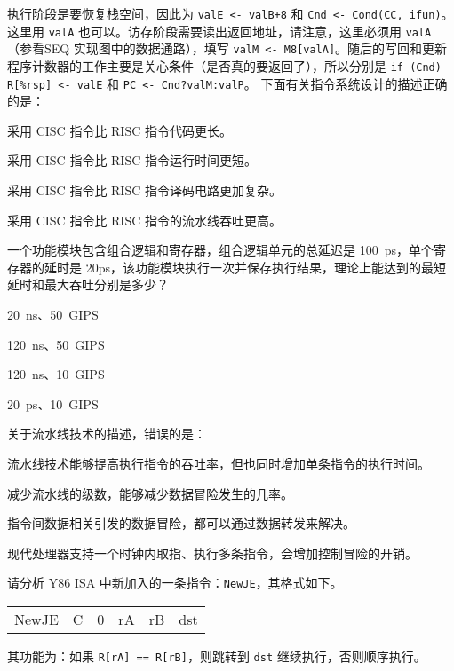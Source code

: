 \begin{problems}
        执行阶段是要恢复栈空间，因此为 \verb|valE <- valB+8| 和 \verb|Cnd <- Cond(CC, ifun)|。这里用 \verb|valA| 也可以。访存阶段需要读出返回地址，请注意，这里必须用 \verb|valA|（参看SEQ 实现图中的数据通路），填写 \verb|valM <- M8[valA]|。随后的写回和更新程序计数器的工作主要是关心条件（是否真的要返回了），所以分别是 \verb|if (Cnd) R[%rsp] <- valE| 和 \verb|PC <- Cnd?valM:valP|。
         下面有关指令系统设计的描述正确的是：
        \begin{choices}
            \item 采用 CISC 指令比 RISC 指令代码更长。
            \item 采用 CISC 指令比 RISC 指令运行时间更短。
            \item 采用 CISC 指令比 RISC 指令译码电路更加复杂。
            \item 采用 CISC 指令比 RISC 指令的流水线吞吐更高。
        \end{choices}
         一个功能模块包含组合逻辑和寄存器，组合逻辑单元的总延迟是 \SI{100}{ps}，单个寄存器的延时是 20ps，该功能模块执行一次并保存执行结果，理论上能达到的最短延时和最大吞吐分别是多少？
        \begin{choices}
            \item \SI{20}{ns}、\SI{50}{GIPS}
            \item \SI{120}{ns}、\SI{50}{GIPS}
            \item \SI{120}{ns}、\SI{10}{GIPS}
            \item \SI{20}{ps}、\SI{10}{GIPS}
        \end{choices}
         关于流水线技术的描述，错误的是：
        \begin{choices}
            \item 流水线技术能够提高执行指令的吞吐率，但也同时增加单条指令的执行时间。
            \item 减少流水线的级数，能够减少数据冒险发生的几率。
            \item 指令间数据相关引发的数据冒险，都可以通过数据转发来解决。
            \item 现代处理器支持一个时钟内取指、执行多条指令，会增加控制冒险的开销。
        \end{choices}
         请分析 Y86 ISA 中新加入的一条指令：\verb|NewJE|，其格式如下。
        \begin{table}[H]
            \centering
            \begin{tabular}{c|c|c|c|c|c|}
                \cline{2-6}
                NewJE & C & 0 & rA & rB & dst \\ \cline{2-6} 
            \end{tabular}
        \end{table}
        其功能为：如果 \verb|R[rA] == R[rB]|，则跳转到 \verb|dst| 继续执行，否则顺序执行。


\end{problems}
